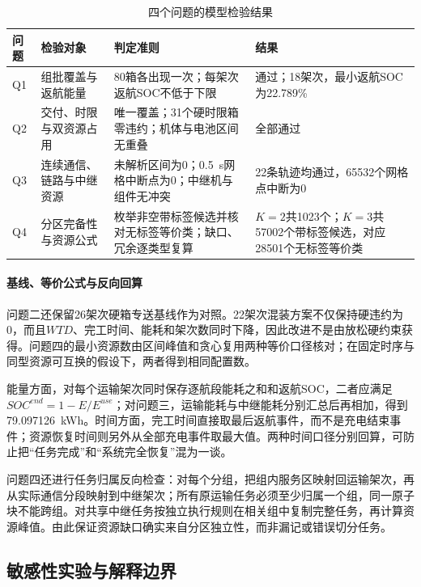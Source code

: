 \begin{table}[htbp]
\centering
\caption{四个问题的模型检验结果}\label{tab:model-check}
\small
\begin{tabularx}{\textwidth}{>{\centering\arraybackslash}p{0.8cm}>{\raggedright\arraybackslash}p{2.8cm}YY}
\toprule
问题 & 检验对象 & 判定准则 & 结果\\
\midrule
Q1 & 组批覆盖与返航能量 & 80箱各出现一次；每架次返航SOC不低于下限 & 通过；18架次，最小返航SOC为22.789\%\\
Q2 & 交付、时限与双资源占用 & 唯一覆盖；31个硬时限箱零违约；机体与电池区间无重叠 & 全部通过\\
Q3 & 连续通信、链路与中继资源 & 未解析区间为0；0.5~s网格中断点为0；中继机与组件无冲突 & 22条轨迹均通过，65532个网格点中断为0\\
Q4 & 分区完备性与资源公式 & 枚举非空带标签候选并核对无标签等价类；缺口、冗余逐类型复算 & $K=2$共1023个；$K=3$共57002个带标签候选，对应28501个无标签等价类\\
\bottomrule
\end{tabularx}
\end{table}

\paragraph{基线、等价公式与反向回算}
问题二还保留26架次硬箱专送基线作为对照。22架次混装方案不仅保持硬违约为0，而且$WTD$、完工时间、能耗和架次数同时下降，因此改进不是由放松硬约束获得。问题四的最小资源数由区间峰值和贪心复用两种等价口径核对；在固定时序与同型资源可互换的假设下，两者得到相同配置数。

能量方面，对每个运输架次同时保存逐航段能耗之和和返航SOC，二者应满足$SOC^{end}=1-E/E^{use}$；对问题三，运输能耗与中继能耗分别汇总后再相加，得到79.097126~kWh。时间方面，完工时间直接取最后返航事件，而不是充电结束事件；资源恢复时间则另外从全部充电事件取最大值。两种时间口径分别回算，可防止把“任务完成”和“系统完全恢复”混为一谈。

问题四还进行任务归属反向检查：对每个分组，把组内服务区映射回运输架次，再从实际通信分段映射到中继架次；所有原运输任务必须至少归属一个组，同一原子块不能跨组。对共享中继任务按独立执行规则在相关组中复制完整任务，再计算资源峰值。由此保证资源缺口确实来自分区独立性，而非漏记或错误切分任务。

\subsection{敏感性实验与解释边界}
